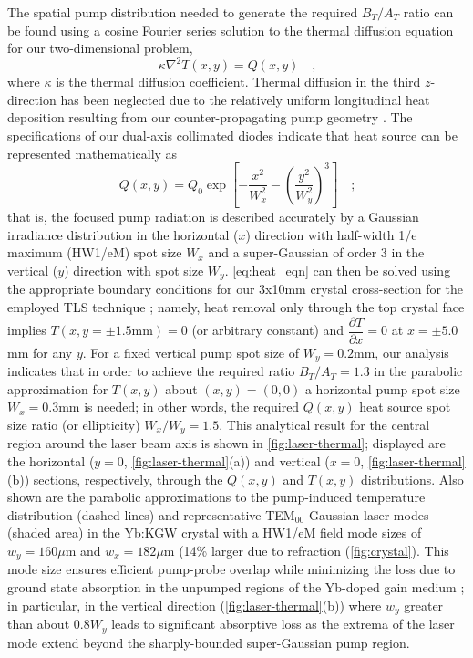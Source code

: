 The spatial pump distribution needed to generate the required $B_T/A_T$ ratio can be found using a cosine Fourier series solution to the thermal diffusion equation for our two-dimensional problem,
\begin{equation} \label{eq:heat_eqn}
  \kappa \nabla^2 T(x,y) = Q(x,y)
  \quad\text{,}
\end{equation}
where $\kappa$ is the thermal diffusion coefficient.
Thermal diffusion in the third $z$-direction has been neglected due to the relatively uniform longitudinal heat deposition resulting from our counter-propagating pump geometry \cite{Rimington_thermal_lens_2004}.
The specifications of our dual-axis collimated diodes \cite{website_limo} indicate that heat source can be represented mathematically as
\begin{equation}
  Q(x,y) = Q_0 \exp \left[ - \frac{x^2}{W_x^2} - \left( \frac{y^2}{W_y^2} \right)^3 \right]
  \quad\text{;}
\end{equation}
that is, the focused pump radiation is described accurately by a Gaussian irradiance distribution in the horizontal ($x$) direction with half-width 1/e maximum (HW1/eM) spot size $W_x$ and a super-Gaussian of order 3 in the vertical ($y$) direction with spot size $W_y$.
\ref{eq:heat_eqn} can then be solved using the appropriate boundary conditions for our 3x10mm crystal cross-section for the employed TLS technique \cite{Rimington_thermal_lens_2004}; namely, heat removal only through the top crystal face implies $T(x,y = \pm 1.5\text{mm}) = 0$ (or arbitrary constant) and $\dfrac{\partial T}{\partial x} = 0$ at $ x = \pm 5.0$mm for any $y$.
For a fixed vertical pump spot size of $W_y = 0.2$mm, our analysis indicates that in order to achieve the required ratio $B_T / A_T = 1.3$ in the parabolic approximation for $T(x,y)$ about $(x,y) = (0,0)$ a horizontal pump spot size $W_x = 0.3$mm is needed; in other words, the required $Q(x,y)$ heat source spot size ratio (or ellipticity) $W_x / W_y = 1.5$.
This analytical result for the central region around the laser beam axis is shown in \ref{fig:laser-thermal}; displayed are the
horizontal ($y = 0$, \ref{fig:laser-thermal}(a)) and vertical ($x = 0$, \ref{fig:laser-thermal}(b)) sections, respectively, through the $Q(x,y)$ and $T(x,y)$ distributions.
Also shown are the parabolic approximations to the pump-induced temperature distribution (dashed lines) and representative TEM$_{00}$ Gaussian laser modes (shaded area) in the Yb:KGW crystal with a HW1/eM field mode sizes of $w_y = 160\mu$m and $w_x = 182 \mu$m (14\% larger due to refraction (\ref{fig:crystal}).
This mode size ensures efficient pump-probe overlap while minimizing the loss due to ground state absorption in the unpumped regions of the Yb-doped gain medium \cite{Brenier_new_criteria}; in particular, in the vertical direction (\ref{fig:laser-thermal}(b)) where $w_y$ greater than about $0.8 W_y$ leads to significant absorptive loss as the extrema of the laser mode extend beyond the sharply-bounded super-Gaussian pump region.

